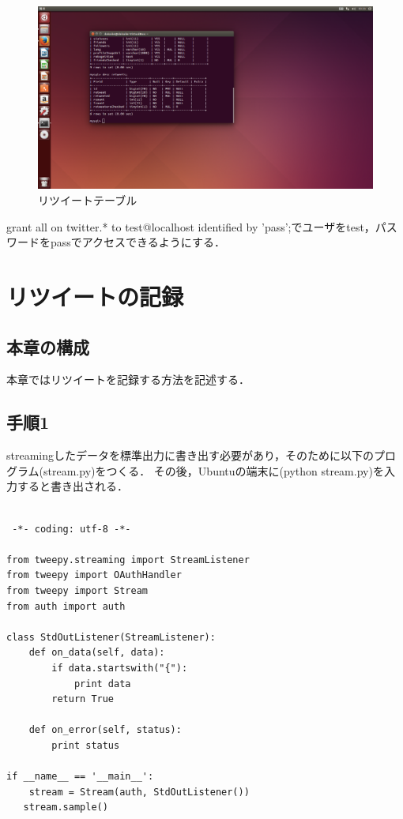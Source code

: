 \begin{figure}[H]
\centering
\includegraphics[width=15cm]{database004.png}
\caption{リツイートテーブル}\label{データベース004の画像}
\end{figure}


grant all on twitter.* to test@localhost identified by 'pass';でユーザをtest，パスワードをpassでアクセスできるようにする．

\clearpage

\section{リツイートの記録}

\subsection{本章の構成}
本章ではリツイートを記録する方法を記述する．

\subsection{手順1}
streamingしたデータを標準出力に書き出す必要があり，そのために以下のプログラム(stream.py)をつくる．
その後，Ubuntuの端末に(python stream.py)を入力すると書き出される．
\begin{lstlisting}

 -*- coding: utf-8 -*-
 
from tweepy.streaming import StreamListener
from tweepy import OAuthHandler
from tweepy import Stream
from auth import auth
 
class StdOutListener(StreamListener):
    def on_data(self, data):
        if data.startswith("{"):
            print data
        return True
 
    def on_error(self, status):
        print status
 
if __name__ == '__main__':
    stream = Stream(auth, StdOutListener())
   stream.sample()

\end{lstlisting}

